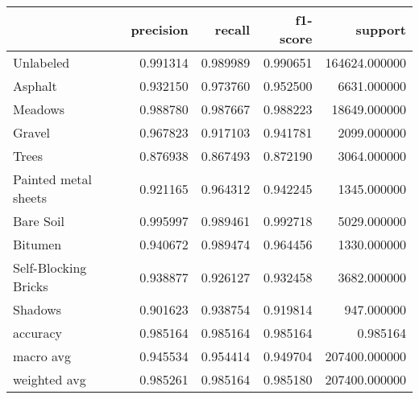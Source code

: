 \begin{tabular}{lrrrr}
\toprule
{} &  precision &    recall &  f1-score &        support \\
\midrule
Unlabeled            &   0.991314 &  0.989989 &  0.990651 &  164624.000000 \\
Asphalt              &   0.932150 &  0.973760 &  0.952500 &    6631.000000 \\
Meadows              &   0.988780 &  0.987667 &  0.988223 &   18649.000000 \\
Gravel               &   0.967823 &  0.917103 &  0.941781 &    2099.000000 \\
Trees                &   0.876938 &  0.867493 &  0.872190 &    3064.000000 \\
Painted metal sheets &   0.921165 &  0.964312 &  0.942245 &    1345.000000 \\
Bare Soil            &   0.995997 &  0.989461 &  0.992718 &    5029.000000 \\
Bitumen              &   0.940672 &  0.989474 &  0.964456 &    1330.000000 \\
Self-Blocking Bricks &   0.938877 &  0.926127 &  0.932458 &    3682.000000 \\
Shadows              &   0.901623 &  0.938754 &  0.919814 &     947.000000 \\
accuracy             &   0.985164 &  0.985164 &  0.985164 &       0.985164 \\
macro avg            &   0.945534 &  0.954414 &  0.949704 &  207400.000000 \\
weighted avg         &   0.985261 &  0.985164 &  0.985180 &  207400.000000 \\
\bottomrule
\end{tabular}
